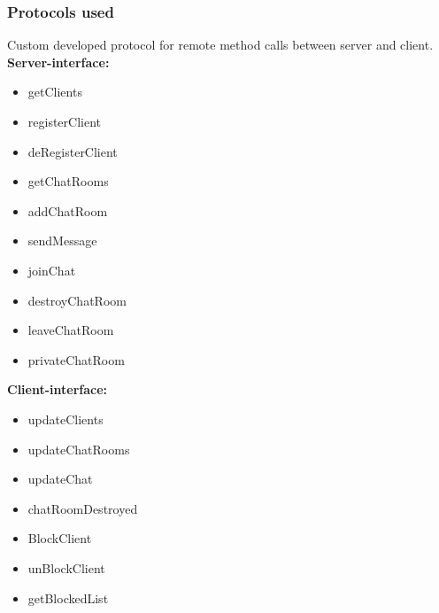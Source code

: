 \documentclass[a4paper, 11pt]{article}
\begin{document}
\subsubsection{Protocols used}
Custom developed protocol for remote method calls between server and client. \\
\textbf{Server-interface:}
\begin{itemize}
\item getClients
\item registerClient
\item deRegisterClient
\item getChatRooms
\item addChatRoom
\item sendMessage
\item joinChat
\item destroyChatRoom
\item leaveChatRoom
\item privateChatRoom
\end{itemize}
\textbf{Client-interface:}
\begin{itemize}
\item updateClients
\item updateChatRooms
\item updateChat
\item chatRoomDestroyed
\item BlockClient
\item unBlockClient
\item getBlockedList
\end{itemize}
\end{document}
